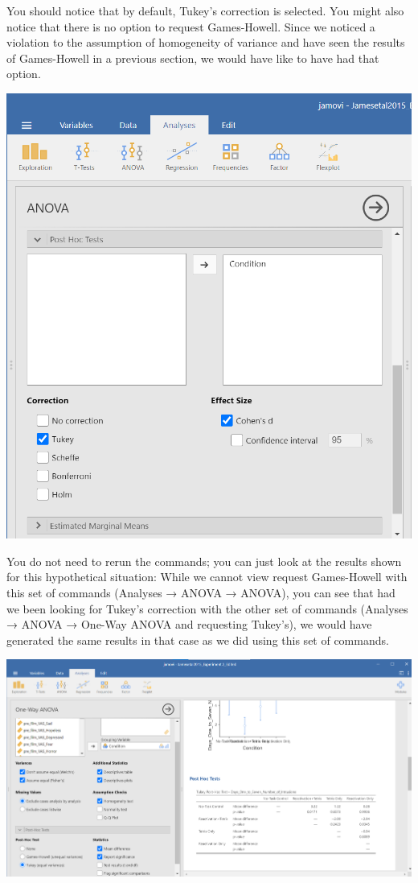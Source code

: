\documentclass[
]{book}
\begin{document}
You should notice that by default, Tukey's correction is selected. You might also notice that there is no option to request Games-Howell. Since we noticed a violation to the assumption of homogeneity of variance and have seen the results of Games-Howell in a previous section, we would have like to have had that option.

\includegraphics{img/ANOVAPostHocCommands3.png}

You do not need to rerun the commands; you can just look at the results shown for this hypothetical situation:
While we cannot view request Games-Howell with this set of commands ({Analyses} → {ANOVA} → { ANOVA}), you can see that had we been looking for Tukey's correction with the other set of commands ({Analyses} → {ANOVA} → { One-Way ANOVA} and requesting Tukey's), we would have generated the same results in that case as we did using this set of commands.

\includegraphics{img/OneWayANOVAPostHocCommands_Tukeys.png}
\end{document}
